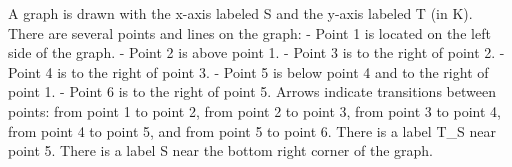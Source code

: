 A graph is drawn with the x-axis labeled S and the y-axis labeled T (in K). There are several points and lines on the graph:
- Point 1 is located on the left side of the graph.
- Point 2 is above point 1.
- Point 3 is to the right of point 2.
- Point 4 is to the right of point 3.
- Point 5 is below point 4 and to the right of point 1.
- Point 6 is to the right of point 5.
Arrows indicate transitions between points: from point 1 to point 2, from point 2 to point 3, from point 3 to point 4, from point 4 to point 5, and from point 5 to point 6.
There is a label T_S near point 5.
There is a label S near the bottom right corner of the graph.